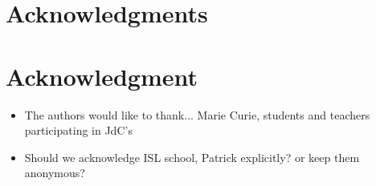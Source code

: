 \documentclass[10pt,journal,compsoc]{IEEEtran}
\begin{document}
\ifCLASSOPTIONcompsoc
  \section*{Acknowledgments}
\else
  \section*{Acknowledgment}
\fi

\begin{itemize}
\item The authors would like to thank... Marie Curie, students and teachers participating in JdC's
\item Should we acknowledge ISL school, Patrick explicitly? or keep them anonymous?
\end{itemize}


\ifCLASSOPTIONcaptionsoff
  \newpage
\fi







%
%

% 
\end{document}
